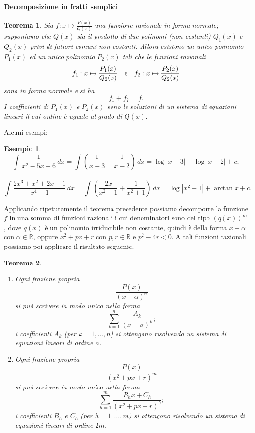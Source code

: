 \documentclass{article}
\theoremstyle{plain}
\newtheorem{thm}{Teorema}[section]
\theoremstyle{definition}
\newtheorem{exmp}{Esempio}[section]
\theoremstyle{remark}
\begin{document}
\paragraph{Decomposizione in fratti semplici}
\begin{bxthm}
\begin{thm}
    Sia $f:x\mapsto\frac{P(x)}{Q(x)}$ una funzione razionale in forma normale; supponiamo che $Q(x)$ sia il prodotto di due polinomi (non costanti) $Q_1(x)$ e $Q_2(x)$ privi di fattori comuni non costanti.
    Allora esistono un unico polinomio $P_1(x)$ ed un unico polinomio $P_2(x)$ tali che le funzioni razionali 
    \[f_1:x\mapsto\dfrac{P_1(x)}{Q_2(x)}\quad\textup{e}\quad f_2:x\mapsto \dfrac{P_2(x)}{Q_2(x)}\]
    sono in forma normale e si ha \[f_1+f_2=f.\] I coefficienti di $P_1(x)$ e $P_2(x)$ sono le soluzioni di un sistema di equazioni lineari il cui ordine è uguale al grado di $Q(x)$.
\end{thm}
\end{bxthm}

\vspace{10pt}

Alcuni esempi:

\vspace{10pt}

\begin{exmp}
    \[\int\dfrac{1}{x^2-5x+6}\,dx=\int\left(\dfrac{1}{x-3}-\dfrac{1}{x-2}\right)\,dx=\log|x-3|-\log|x-2|+c;\]\\
    \[\int\dfrac{2x^3+x^2+2x-1}{x^4-1}\,dx=\int\left(\dfrac{2x}{x^2-1}+\dfrac{1}{x^2+1}\right)\,dx=\log|x^2-1|+\arctan x+c.\]
\end{exmp}

\vspace{10pt}

Applicando ripetutamente il teorema precedente possiamo decomporre la funzione $f$ in una somma di funzioni razionali i cui 
denominatori sono del tipo $(q(x))^m$, dove $q(x)$ è un polinomio irriducibile non costante, quindi è della forma $x-\alpha$ con $\alpha\in\mathbb{R}$,
oppure $x^2+px+r$ con $p,r\in\mathbb{R}$ e $p^2-4r<0$. A tali funzioni razionali possiamo poi applicare il risultato seguente.

\vspace{10pt}

\begin{bxthm}
\begin{thm}\hfill
    \begin{enumerate}
        \item Ogni frazione propria \[\dfrac{P(x)}{(x-\alpha)^n}\] si può scrivere in modo unico nella forma \[\sum_{k=1}^{n}\dfrac{A_k}{(x-\alpha)^k};\]
        i coefficienti $A_k$ (per $k=1,\dots,n$) si ottengono risolvendo un sistema di equazioni lineari di ordine $n$.
        \item Ogni frazione propria \[\dfrac{P(x)}{(x^2+px+r)^m}\] si può scrivere in modo unico nella forma \[\sum_{h=1}^{m}\dfrac{B_hx+C_h}{(x^2+px+r)^h};\]
        i coefficienti $B_h$ e $C_h$ (per $h=1,\dots,m$) si ottengono risolvendo un sistema di equazioni lineari di ordine $2m$.
    \end{enumerate}
\end{thm}
\end{bxthm}
\end{document}
